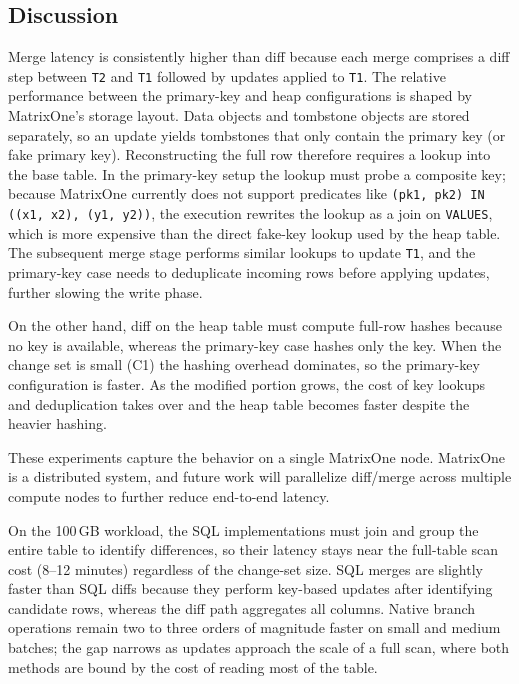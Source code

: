 \documentclass[sigconf,nonacm]{acmart} %
\begin{document}
\subsection{Discussion}
Merge latency is consistently higher than diff because each merge
comprises a diff step between \texttt{T2} and \texttt{T1} followed by
updates applied to \texttt{T1}.  The relative performance between the
primary-key and heap configurations is shaped by MatrixOne's storage
layout.  Data objects and tombstone objects are stored separately, so an
update yields tombstones that only contain the primary key (or fake
primary key).  Reconstructing the full row therefore requires a lookup
into the base table.  In the primary-key setup the lookup must probe a
composite key; because MatrixOne currently does not support predicates
like \texttt{(pk1, pk2) IN ((x1, x2), (y1, y2))}, the execution rewrites
the lookup as a join on \texttt{VALUES}, which is more expensive than
the direct fake-key lookup used by the heap table.  The subsequent merge
stage performs similar lookups to update \texttt{T1}, and the primary-key
case needs to deduplicate incoming rows before applying updates, further
slowing the write phase.

On the other hand, diff on the heap table must compute full-row hashes
because no key is available, whereas the primary-key case hashes only
the key.  When the change set is small (C1) the hashing overhead
dominates, so the primary-key configuration is faster.  As the modified
portion grows, the cost of key lookups and deduplication takes over and
the heap table becomes faster despite the heavier hashing.

These experiments capture the behavior on a single MatrixOne node.
MatrixOne is a distributed system, and future work will parallelize
diff/merge across multiple compute nodes to further reduce end-to-end
latency.

On the 100\,GB workload, the SQL implementations must join and group the
entire table to identify differences, so their latency stays near the
full-table scan cost (8--12 minutes) regardless of the change-set size.
SQL merges are slightly faster than SQL diffs because they perform
key-based updates after identifying candidate rows, whereas the diff
path aggregates all columns.  Native branch operations remain two to
three orders of magnitude faster on small and medium batches; the gap
narrows as updates approach the scale of a full scan, where both methods
are bound by the cost of reading most of the table.
\end{document}
